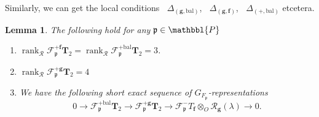 \documentclass[10pt]{amsart}
\numberwithin{equation}{section}
\newtheorem{lemma}[thm]{Lemma}
\theoremstyle{definition}
\theoremstyle{remark} %
\DeclareMathOperator{\rank}{rank}
\DeclareMathOperator{\tr}{{tr}^*}
\renewcommand{\b}{\mathrm{bal}}
\newcommand{\f}{\mathbf{f}}
\newcommand{\scrF}{\mathscr{F}}
\newcommand{\g}{\mathbf{g}}
\newcommand{\p}{\mathfrak{p}}
\newcommand{\bP}{\mathbbl{P}}
\newcommand{\R}{\mathcal{R}}
\newcommand{\T}{\mathbf{T}}
\begin{document}
	Similarly, we can get the local conditions $ \tr \Delta_{(\g, \b)}$,  $\tr \Delta_{(\g, \f)}$, $ \tr \Delta_{(+,\b)} $ etcetera.
	\begin{lemma}
		\label{localses}
		The following hold for any $ \p \in \bP $
		\begin{enumerate}
			\item $ \rank_{\R}\scrF^{+\mathbf{f}}_{\p}\T_{2} = \rank_{\R}\scrF^{+\mathrm{bal}}_{\p}\T_{2} = 3$.
			\item $ \rank_{\R} \scrF^{+\g}_{\p}\T_{2} = 4 $
			\item We have the following short exact sequence of $ G_{F_{\p}} $-representations
			\begin{equation}
				\label{ses_sep18}
				0 \rightarrow \scrF^{+\mathrm{bal}}_{\p}\T_{2} \rightarrow \scrF^{+\g}_{\p}\T_{2} \rightarrow \scrF^-_{\p}T_\f \otimes_{O} \R_{\g}(\lambda) \rightarrow 0. 
			\end{equation}
		\end{enumerate}
		
	\end{lemma}
\end{document}
